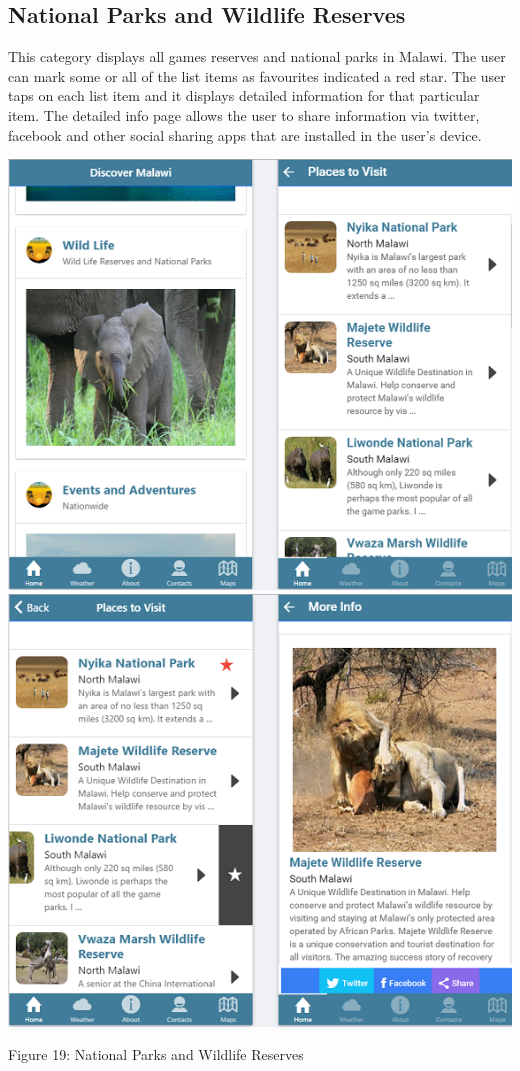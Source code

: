 \subsection{National Parks and Wildlife Reserves}
This category displays all games reserves and national parks in Malawi. The user can mark some or all of the list items as favourites indicated a red star. The user taps on each list item and it displays detailed information for that particular item. The detailed info page allows the user to share information via twitter, facebook and other social sharing apps that are installed in the user’s device.

\begin{center}    
	\includegraphics{img/wildlife1.png}
	\includegraphics{img/wildlife.png}
\end{center}
\begin{center}
	Figure 19: National Parks and Wildlife Reserves 
\end{center}
